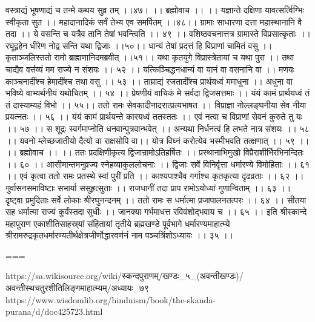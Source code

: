 वस्त्राद्यं भूषणाद्यं च तन्मे कथय सुव्र तम् ।।४७। ।।
ब्रह्मोवाच ।। ।।
यज्ञान्ते दक्षिणा यावत्सर्त्विग्भिः स्वीकृता सुत ।।
महादानादिकं सर्वं तेभ्य एव समर्पितम् ।।४८।।
ग्रामाः साधारणा दत्ता महास्थानानि वै तदा ।।
ये वसन्ति च यत्रैव तानि तेषां भवन्त्विति ।। ४९ ।।
वशिष्ठवचनात्तत्र ग्रामास्ते विप्रसात्कृताः ।।
रघूद्वहेन धीरेण नोद्व सन्ति यथा द्विजाः ।।५०।।
धान्यं तेषां प्रदत्तं हि विप्राणां चामितं वसु ।।
कृताञ्जलिस्ततो रामो ब्राह्मणानिदमब्रवीत् ।।५१।।
यथा कृतयुगे विप्रास्त्रेतायां च यथा पुरा ।।
तथा चाद्यैव वर्त्तव्यं मम राज्ये न संशयः ।। ५२ ।।
यत्किञ्चिद्धनधान्यं वा यानं वा वसनानि वा ।।
मणयः काञ्चनादींश्च हेमादींश्च तथा वसु ।। ५३ ।।
ताम्राद्यं रजतादींश्च प्रार्थयध्वं ममाधुना ।।
अधुना वा भविष्ये वाभ्यर्थनीयं यथोचितम् ।। ५४ ।।
प्रेषणीयं वाचिकं मे सर्वदा द्विजसत्तमाः ।।
यंयं कामं प्रार्थयध्वं तं तं दास्याम्यहं विभो ।। ५५।।
ततो रामः सेवकादीनादरात्प्रत्यभाषत ।।
विप्राज्ञा नोल्लङ्घनीया सेव नीया प्रयत्नतः ।। ५६ ।।
यंयं कामं प्रार्थयन्ते कारयध्वं ततस्ततः ।।
एवं नत्वा च विप्राणां सेवनं कुरुते तु यः ।। ५७ ।।
स शूद्रः स्वर्गमाप्नोति धनवान्पुत्रवान्भवेत् ।।
अन्यथा निर्धनत्वं हि लभते नात्र संशयः ।। ५८ ।।
यवनो म्लेच्छजातीयो दैत्यो वा राक्षसोपि वा।।
योत्र विघ्नं करोत्येव भस्मीभवति तत्क्षणात् ।। ५९ ।।
।। ब्रह्मोवाच ।। ।।
ततः प्रदक्षिणीकृत्य द्विजान्रामोऽतिहर्षितः ।।
प्रस्थानाभिमुखो विप्रैराशीर्भिरभिनन्दितः ।। ६० ।।
आसीमान्तमनुव्रज्य स्नेहव्याकुललोचनाः ।।
द्विजाः सर्वे विनिर्वृत्ता धर्मारण्ये विमोहिताः ।। ६१ ।।
एवं कृत्वा ततो रामः प्रतस्थे स्वां पुरीं प्रति ।।
काश्यपाश्चैव गर्गाश्च कृतकृत्या दृढव्रताः ।। ६२ ।।
गुर्वासनसमाविष्टाः सभार्या ससुहृत्सुताः ।।
राजधानीं तदा प्राप रामोऽयोध्यां गुणान्विताम् ।। ६३ ।।
दृष्ट्वा प्रमुदिताः सर्वे लोकाः श्रीरघुनन्दनम् ।।
ततो रामः स धर्मात्मा प्रजापालनतत्परः ।। ६४ ।।
सीतया सह धर्मात्मा राज्यं कुर्वंस्तदा सुधीः ।।
जानक्या गर्भमाधत्त रविवंशोद्भवाय च ।। ६५ ।।
इति श्रीस्कान्दे महापुराण एकाशीतिसाहस्र्यां संहितायां तृतीये ब्रह्मखण्डे पूर्वभागे धर्मारण्यमाहात्म्ये श्रीरामरुद्रकृतधर्मारण्यतीर्थक्षेत्रजीर्णोद्धारवर्णनं नाम पञ्चत्रिंशोऽध्यायः ।। ३५ ।।

===

https://sa.wikisource.org/wiki/स्कन्दपुराणम्/खण्डः_५_(अवन्तीखण्डः)/अवन्तीस्थचतुरशीतिलिङ्गमाहात्म्यम्/अध्यायः_७९
https://www.wisdomlib.org/hinduism/book/the-skanda-purana/d/doc425723.html


